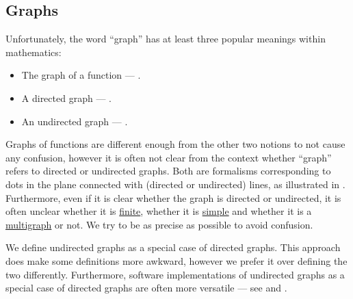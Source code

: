 \subsection{Graphs}\label{subsec:graphs}

\begin{remark}\label{rem:directed_and_undirected_graphs}
  Unfortunately, the word \enquote{graph} has at least three popular meanings within mathematics:
  \begin{itemize}
    \item The graph of a function --- .
    \item A directed graph --- .
    \item An undirected graph --- .
  \end{itemize}

  Graphs of functions are different enough from the other two notions to not cause any confusion, however it is often not clear from the context whether \enquote{graph} refers to directed or undirected graphs. Both are formalisms corresponding to dots in the plane connected with (directed or undirected) lines, as illustrated in . Furthermore, even if it is clear whether the graph is directed or undirected, it is often unclear whether it is \hyperref[def:directed_graph/order]{finite}, whether it is \hyperref[def:directed_graph/simple]{simple} and whether it is a \hyperref[def:multigraph]{multigraph} or not. We try to be as precise as possible to avoid confusion.

  We define undirected graphs as a special case of directed graphs. This approach does make some definitions more awkward, however we prefer it over defining the two differently. Furthermore, software implementations of undirected graphs as a special case of directed graphs are often more versatile --- see \cite[sec. 5.4]{Erickson2019} and \cite[ch. 1, sec. 2.4]{GondranMinoux1984Graphs}.
\end{remark}

